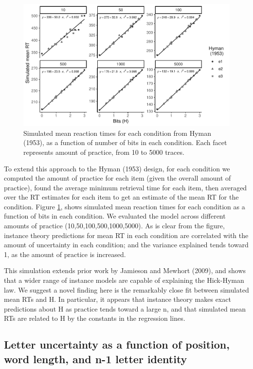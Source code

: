 \documentclass[,man,floatsintext]{apa6}
\begin{document}
\begin{figure}
\centering
\includegraphics{figures/Hyman_figure.pdf}
\caption{\label{fig:figureHyman}Simulated mean reaction times for each condition from Hyman (1953), as a function of number of bits in each condition. Each facet represents amount of practice, from 10 to 5000 traces.}
\end{figure}



To extend this approach to the Hyman (1953) design, for each condition we computed the amount of practice for each item (given the overall amount of practice), found the average minimum retrieval time for each item, then averaged over the RT estimates for each item to get an estimate of the mean RT for the condition. Figure \ref{fig:figureHyman}, shows simulated mean reaction times for each condition as a function of bits in each condition. We evaluated the model across different amounts of practice (10,50,100,500,1000,5000). As is clear from the figure, instance theory predictions for mean RT in each condition are correlated with the amount of uncertainty in each condition; and the variance explained tends toward 1, as the amount of practice is increased.

This simulation extends prior work by Jamieson and Mewhort (2009), and shows that a wider range of instance models are capable of explaining the Hick-Hyman law. We suggest a novel finding here is the remarkably close fit between simulated mean RTs and H. In particular, it appears that instance theory makes exact predictions about H as practice tends toward a large n, and that simulated mean RTs are related to H by the constants in the regression lines.

\hypertarget{letter-uncertainty-as-a-function-of-position-word-length-and-n-1-letter-identity}{%
\subsection{Letter uncertainty as a function of position, word length, and n-1 letter identity}\label{letter-uncertainty-as-a-function-of-position-word-length-and-n-1-letter-identity}}
\end{document}
